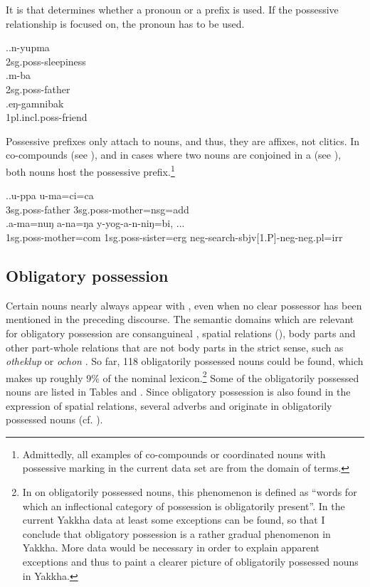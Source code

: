 It is  that determines whether a pronoun or a prefix is used. If the possessive relationship is focused on, the pronoun has to be used.

\ex.\ag.n-yupma\\
{\sc 2sg.poss-}sleepiness\\
\bg.m-ba\\
{\sc 2sg.poss-}father \\
\bg.eŋ-gamnibak\\
{\sc 1pl.incl.poss-}friend \\

Possessive prefixes only attach to nouns, and thus, they are affixes, not clitics. In co-compounds (see \Next[a]), and in cases where two nouns are conjoined in a  (see \Next[b]), both nouns host the possessive prefix.\footnote{Admittedly, all examples of co-compounds or coordinated nouns with possessive marking in the current data set are from the domain of  terms.}

\ex.\ag.u-ppa   u-ma=ci=ca \\
{\sc 3sg.poss-}father {\sc 3sg.poss-}mother{\sc =nsg=add}\\
  
\bg.a-ma=nuŋ                a-na=ŋa                      y-yog-a-n-niŋ=bi, ...\\
{\sc 1sg.poss-}mother{\sc =com} {\sc 1sg.poss-}sister{\sc =erg} {\sc neg-}search{\sc -sbjv[1.P]-neg-neg.pl=irr}\\
  


\subsection{Obligatory  possession}\label{inh-poss}

Certain nouns nearly always  appear with , even when no clear possessor has been  mentioned in the preceding discourse. The semantic domains which are relevant for obligatory possession are consanguineal , spatial relations (),  body parts and other part-whole relations that are not body parts in the strict sense, such as \emph{otheklup}  or \emph{ochon} . So far, 118 obligatorily possessed nouns could be found, which makes up roughly 9\% of the nominal lexicon.\footnote{In  \citet[242]{Bickeletal2005_Obligatory} on obligatorily possessed nouns, this phenomenon is defined as “words for which an inflectional category of possession is obligatorily present”. In the current Yakkha data at least some exceptions can be found, so that I conclude that obligatory possession is a rather gradual phenomenon  in Yakkha. More data would be necessary in order to explain apparent exceptions and thus to paint a clearer picture of obligatorily possessed nouns in Yakkha.} Some of the  obligatorily possessed nouns are listed in Tables  and . Since obligatory possession is also found in the expression of spatial relations, several adverbs and  originate in obligatorily possessed nouns (cf. ).


